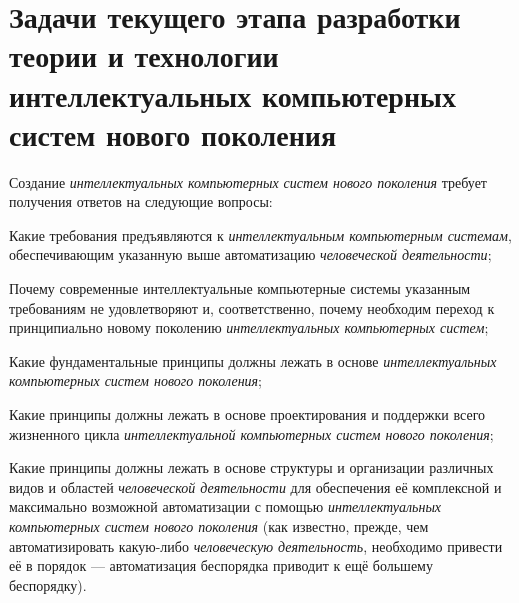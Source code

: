 \section*{Задачи текущего этапа разработки теории и технологии интеллектуальных компьютерных систем нового поколения}
\label{concl_tasks_current_stage_theory_and_technology_development}

Создание \textit{интеллектуальных компьютерных систем нового поколения} требует получения ответов на следующие вопросы:
\begin{textitemize}
	\item Какие требования предъявляются к \textit{интеллектуальным компьютерным системам}, обеспечивающим указанную выше  автоматизацию \textit{человеческой деятельности};
	\item Почему современные интеллектуальные компьютерные системы указанным требованиям не удовлетворяют и, соответственно, почему необходим переход к принципиально новому поколению \textit{интеллектуальных компьютерных систем};
	\item Какие фундаментальные принципы должны лежать в основе \textit{интеллектуальных компьютерных систем нового поколения};
	\item Какие принципы должны лежать в основе  проектирования и поддержки всего жизненного цикла \textit{интеллектуальной компьютерных систем нового поколения};
	\item Какие принципы должны лежать в основе структуры и организации различных видов и областей \textit{человеческой деятельности} для обеспечения её комплексной и максимально возможной автоматизации с помощью \textit{интеллектуальных компьютерных систем нового поколения} (как известно, прежде, чем автоматизировать какую-либо \textit{человеческую деятельность}, необходимо привести её в порядок --- автоматизация беспорядка приводит к ещё большему беспорядку).
\end{textitemize}


